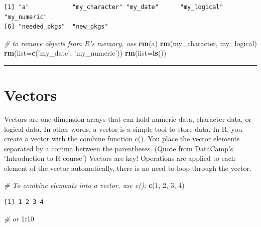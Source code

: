 \documentclass[
]{book}
\newenvironment{Shaded}{\begin{snugshade}}{\end{snugshade}}
\newcommand{\CommentTok}[1]{\textcolor[rgb]{0.56,0.35,0.01}{\textit{#1}}}
\newcommand{\DataTypeTok}[1]{\textcolor[rgb]{0.13,0.29,0.53}{#1}}
\newcommand{\DecValTok}[1]{\textcolor[rgb]{0.00,0.00,0.81}{#1}}
\newcommand{\KeywordTok}[1]{\textcolor[rgb]{0.13,0.29,0.53}{\textbf{#1}}}
\newcommand{\NormalTok}[1]{#1}
\newcommand{\OperatorTok}[1]{\textcolor[rgb]{0.81,0.36,0.00}{\textbf{#1}}}
\newcommand{\StringTok}[1]{\textcolor[rgb]{0.31,0.60,0.02}{#1}}
\begin{document}
\begin{verbatim}
[1] "a"            "my_character" "my_date"      "my_logical"   "my_numeric"  
[6] "needed_pkgs"  "new_pkgs"    
\end{verbatim}

\begin{Shaded}
\begin{Highlighting}[]
\CommentTok{# to remove objects from R's memory, use}
\KeywordTok{rm}\NormalTok{(a)}
\KeywordTok{rm}\NormalTok{(my_character, my_logical)}
\KeywordTok{rm}\NormalTok{(}\DataTypeTok{list=}\KeywordTok{c}\NormalTok{(}\StringTok{'my_date'}\NormalTok{, }\StringTok{'my_numeric'}\NormalTok{))}
\KeywordTok{rm}\NormalTok{(}\DataTypeTok{list=}\KeywordTok{ls}\NormalTok{())}
\end{Highlighting}
\end{Shaded}

\begin{center}\rule{0.5\linewidth}{0.5pt}\end{center}

\hypertarget{vectors}{%
\section{Vectors}\label{vectors}}

Vectors are one-dimension arrays that can hold numeric data, character data, or logical data. In other words, a vector is a simple tool to store data. In R, you create a vector with the combine function c(). You place the vector elements separated by a comma between the parentheses. (Quote from DataCamp's `Introduction to R course') Vectors are key! Operations are applied to each element of the vector automatically, there is no need to loop through the vector.

\begin{Shaded}
\begin{Highlighting}[]
\CommentTok{# To combine elements into a vector, use c():}
\KeywordTok{c}\NormalTok{(}\DecValTok{1}\NormalTok{, }\DecValTok{2}\NormalTok{, }\DecValTok{3}\NormalTok{, }\DecValTok{4}\NormalTok{)}
\end{Highlighting}
\end{Shaded}

\begin{verbatim}
[1] 1 2 3 4
\end{verbatim}

\begin{Shaded}
\begin{Highlighting}[]
\CommentTok{# or}
\DecValTok{1}\OperatorTok{:}\DecValTok{10}
\end{Highlighting}
\end{Shaded}
\end{document}

